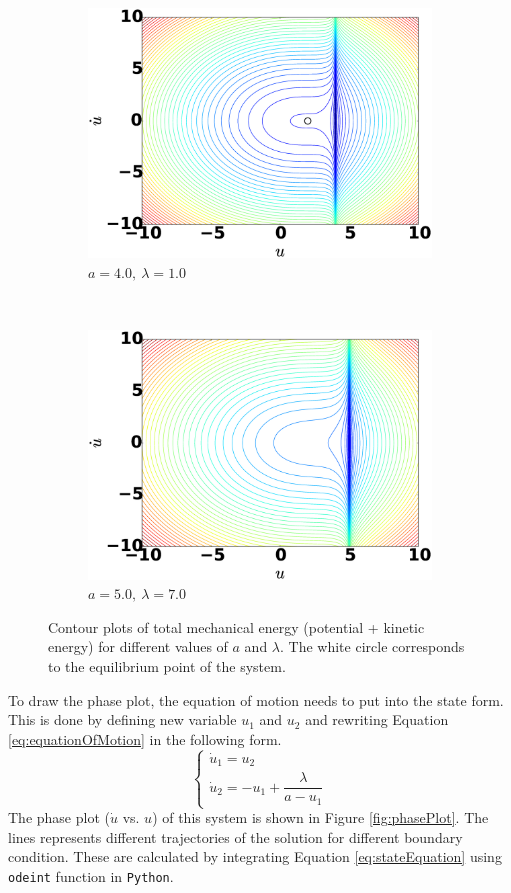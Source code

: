 \documentclass[12pt, a4paper]{extreport}
\begin{document}
\begin{figure}[H]
\begin{subfigure}[h]{8.0 cm}
        \includegraphics[width=8.0 cm]{figure/mechanical_a40_lambda40.eps}
		\caption{$a=4.0,\ \lambda = 1.0$}
    \end{subfigure}
    \\
    	\begin{subfigure}[h]{8.0 cm}
        \includegraphics[width=8.0 cm]{figure/mechanical_a50_lambda70.eps}
		\caption{$a=5.0,\ \lambda = 7.0$}
    \end{subfigure}
    \caption{Contour plots of total mechanical energy (potential + kinetic energy) for different values of $a$ and $\lambda$. The white circle corresponds to the equilibrium point of the system.}
    \label{fig:potentialFunction}
\end{figure}
%
To draw the phase plot, the equation of motion needs to put into the state form. This is done by defining new variable $u_1$ and $u_2$ and rewriting Equation \eqref{eq:equationOfMotion} in the following form.
%
\begin{equation}\label{eq:stateEquation}
	\begin{cases}
    \dot{u}_1 = u_2 \\
    \dot{u}_2 = -u_1 + \dfrac{\lambda}{a - u_1}
	\end{cases}
\end{equation}
%
The phase plot ($\dot{u}$ vs. $u$) of this system is shown in Figure \ref{fig:phasePlot}. The lines represents different trajectories of the solution for different boundary condition. These are calculated by integrating Equation \eqref{eq:stateEquation} using \texttt{odeint} function in \texttt{Python}.
\end{document}
